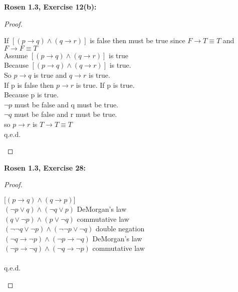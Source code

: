 \documentclass[10pt]{article}
\begin{document}
{\bf Rosen 1.3, Exercise 12(b):}  \\


\begin{proof}
\begin{framed}
If $[(p \rightarrow q)\land (q \rightarrow r)]$ is false then  must be true since $F \rightarrow T \equiv T$ and $F \rightarrow F \equiv T$\\
Assume $[(p \rightarrow q)\land (q \rightarrow r)]$ is true\\
Because $[(p \rightarrow q)\land (q \rightarrow r)]$ is true.\\
So $p \rightarrow q$ is true and $q \rightarrow r$ is true.\\
If p is false then $p \rightarrow r$ is true.
If p is true.\\
Because p is true.\\
$\neg p$ must be false and q must be true.\\
$\neg q$ must be false and r must be true.\\
so $p \rightarrow r$ is $T \rightarrow T \equiv T$\\

q.e.d. 
\end{framed}
\end{proof}



\newpage

\noindent
{\bf Rosen 1.3, Exercise 28:}  \\

\begin{proof}
\begin{framed}
\equiv $\big[(p \rightarrow q) \land (q \rightarrow p)]$\\
\equiv $(\neg p \lor q) \land (\neg q \lor p)$     DeMorgan's law\\
\equiv $(q \lor \neg p) \land (p \lor \neg q)$
commutative law\\
\equiv $(\neg \neg q \lor \neg p) \land (\neg \neg p \lor \neg q)$
double negation\\
\equiv $(\neg q \rightarrow \neg p) \land (\neg p \rightarrow \neg q)$
DeMorgan's law\\
\equiv $(\neg p \rightarrow \neg q) \land (\neg q \rightarrow \neg p)$
commutative law\\
\equiv \\
q.e.d.
\end{framed}
\end{proof}


\newpage
\end{document}
